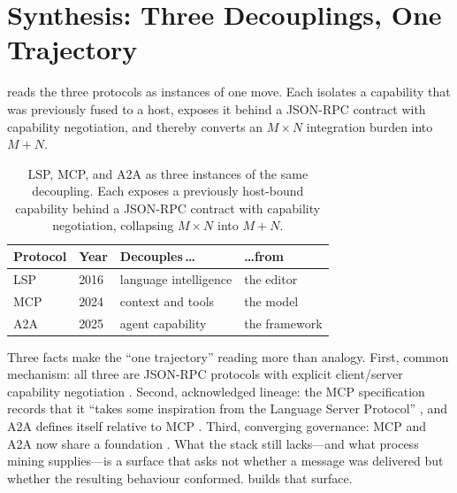 \section{Synthesis: Three Decouplings, One Trajectory}
\label{sec:bg-synthesis}

 reads the three protocols as instances of one move.
Each isolates a capability that was previously fused to a host, exposes it behind
a JSON-RPC contract with capability negotiation, and thereby converts an
$M \times N$ integration burden into $M + N$.

\begin{table}[t]
\centering
\caption[Three decouplings, one trajectory]{LSP, MCP, and A2A as three instances
of the same decoupling. Each exposes a previously host-bound capability behind a
JSON-RPC contract with capability negotiation, collapsing $M \times N$ into
$M + N$.}
\label{tab:three-decouplings}
\small
\begin{tabularx}{\textwidth}{@{}l l l Y@{}}
\toprule
\textbf{Protocol} & \textbf{Year} & \textbf{Decouples\,\dots} & \textbf{\dots from} \\
\midrule
LSP & 2016 & language intelligence & the editor \citep{lsp-redhat-2016} \\
MCP & 2024 & context and tools & the model \citep{mcp-anthropic-2024} \\
A2A & 2025 & agent capability & the framework \citep{a2a-google-2025} \\
\bottomrule
\end{tabularx}
\end{table}

Three facts make the ``one trajectory'' reading more than analogy. First, common
mechanism: all three are JSON-RPC protocols with explicit client/server
capability negotiation \citep{lsp-spec-318,mcp-spec-2025,a2a-spec}. Second,
acknowledged lineage: the MCP specification records that it ``takes some
inspiration from the Language Server Protocol'' \citep{mcp-spec-2025}, and A2A
defines itself relative to MCP \citep{a2a-mcp}. Third, converging governance: MCP
and A2A now share a foundation \citep{lf-a2a-press,lf-aaif-press}. What the stack
still lacks---and what process mining supplies---is a surface that asks not
whether a message was delivered but whether the resulting behaviour conformed.
 builds that surface.
